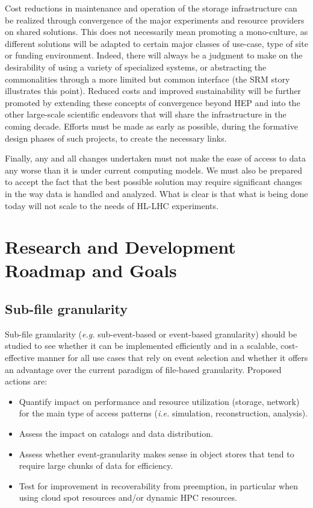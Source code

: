 \documentclass[12pt,a4paper]{article}
\begin{document}
Cost reductions in maintenance and operation of the storage
infrastructure can be realized through convergence of the major
experiments and resource providers on shared solutions. This does not
necessarily mean promoting a mono-culture, as different solutions will be
adapted to certain major classes of use-case, type of site or funding
environment. Indeed, there will always be a judgment to make on the
desirability of using a variety of specialized systems, or abstracting
the commonalities through a more limited but common interface (the SRM
story illustrates this point). Reduced costs and improved sustainability
will be further promoted by extending these concepts of convergence
beyond HEP and into the other large-scale scientific endeavors that
will share the infrastructure in the coming decade. Efforts must be made
as early as possible, during the formative design phases of such
projects, to create the necessary links.

Finally, any and all changes undertaken must not make the ease of access
to data any worse than it is under current computing models. We must
also be prepared to accept the fact that the best possible solution may
require significant changes in the way data is handled and analyzed.
What is clear is that what is being done today will not scale to the
needs of HL-LHC experiments.

\section{Research and Development Roadmap and
Goals}\label{research-and-development-roadmap-and-goals}

\subsection{Sub-file granularity}\label{sub-file-granularity}
Sub-file granularity ({\it e.g.} sub-event-based or event-based granularity) should be studied
to see whether it can be implemented efficiently and in a scalable, cost-effective
manner for all use cases that rely on event selection and whether it offers an advantage
over the current paradigm of file-based granularity. Proposed actions are:

\begin{itemize}
\item Quantify impact on performance
  and resource utilization (storage, network) for the main type of
  access patterns ({\it i.e.} simulation, reconstruction, analysis).
\item Assess the impact on catalogs and
  data distribution.
\item Assess whether
  event-granularity makes sense in object stores that tend to require
  large chunks of data for efficiency.
\item Test for improvement in recoverability
  from preemption, in particular when using cloud spot resources and/or
  dynamic HPC resources.
\end{itemize}
\end{document}
